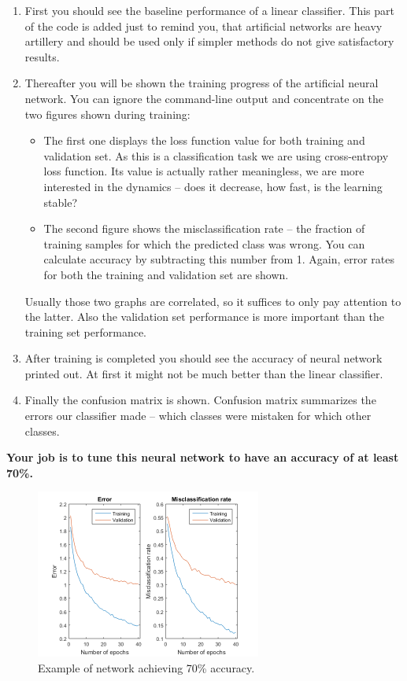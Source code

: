 \documentclass[a4paper,11pt]{article}
\begin{document}
\begin{enumerate}
	\item First you should see the baseline performance of a linear classifier. This part of the code is added just to remind you, that artificial networks are heavy artillery and should be used only if simpler methods do not give satisfactory results. 
	\item Thereafter you will be shown the training progress of the artificial neural network. You can ignore the command-line output and concentrate on the two figures shown during training:
	\begin{itemize}
		\item The first one displays the loss function value for both training and validation set. As this is a classification task we are using cross-entropy loss function. Its value is actually rather meaningless, we are more interested in the dynamics -- does it decrease, how fast, is the learning stable?
		\item The second figure shows the misclassification rate -- the fraction of training samples for which the predicted class was wrong. You can calculate accuracy by subtracting this number from 1. Again, error rates for both the training and validation set are shown.
	\end{itemize}
	Usually those two graphs are correlated, so it suffices to only pay attention to the latter. Also the validation set performance is more important than the training set performance.
	\item After training is completed you should see the accuracy of neural network printed out. At first it might not be much better than the linear classifier.
	\item Finally the confusion matrix is shown. Confusion matrix summarizes the errors our classifier made -- which classes were mistaken for which other classes.
\end{enumerate}

\textbf{Your job is to tune this neural network to have an accuracy of at least 70\%.}\\

\begin{figure}[h]
	\centering
	\includegraphics[width=0.66\textwidth]{training_loss.png}
	\caption{Example of network achieving 70\% accuracy.}
\end{figure}
\end{document}
